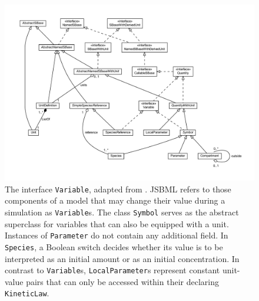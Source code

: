 \begin{figure}[p]
 \centering
 \includegraphics[width=\textwidth]{img/Symbol}
 \caption[The interface \texttt{Variable}]{The interface \texttt{Variable},
 adapted from \citet{Draeger2011}. JSBML refers to those components of a model
 that may change their value during a simulation as \texttt{Variable}s. The
 class \texttt{Symbol} serves as the abstract superclass for variables that can
 also be equipped with a unit. Instances of \texttt{Parameter} do not contain
 any additional field. In \texttt{Species}, a Boolean switch decides whether its
 value is to be interpreted as an initial amount or as an initial concentration.
 In contrast to \texttt{Variable}s, \texttt{LocalParameter}s represent constant
 unit-value pairs that can only be accessed within their declaring
 \texttt{KineticLaw}.}
 \label{fig:Variable}
\end{figure}
